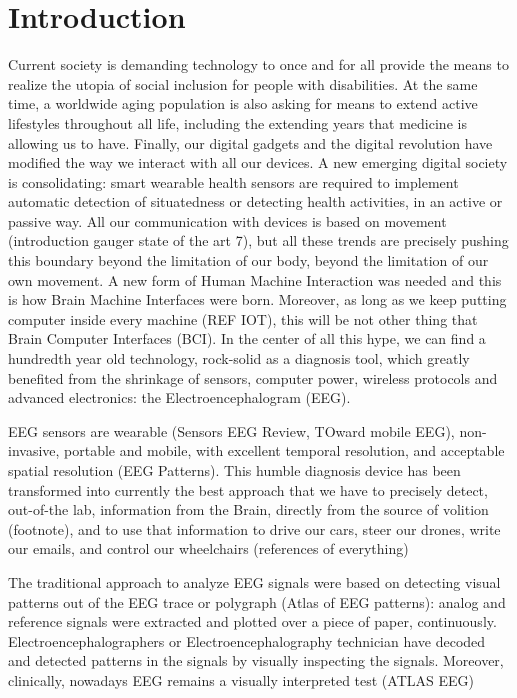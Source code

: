 \documentclass[sensors,article,submit,moreauthors,pdftex,10pt,a4paper]{mdpi}
\begin{document}

\setcounter{section}{-1} %

\section{Introduction}

Current society is demanding technology to once and for all provide the means to realize the utopia of social inclusion for people with disabilities.  At the same time, a worldwide aging population is also asking for means to extend active lifestyles throughout all life, including the extending years that medicine is allowing us to have.
Finally, our digital gadgets and the digital revolution have modified the way we interact with all our devices.  A new emerging digital society is consolidating: smart wearable health sensors are required to implement automatic detection of situatedness or detecting health activities, in an active or passive way.
All our communication with devices is based on movement (introduction gauger state of the art 7), but all these trends are precisely pushing this boundary beyond the limitation of our body, beyond the limitation of our own movement.  A new form of Human Machine Interaction was needed and this is how Brain Machine Interfaces were born.  Moreover, as long as we keep putting computer inside every machine (REF IOT), this will be not other thing that Brain Computer Interfaces (BCI).
In the center of all this hype, we can find a hundredth year old technology, rock-solid as a diagnosis tool, which greatly benefited from the shrinkage of sensors, computer power, wireless protocols and advanced electronics: the Electroencephalogram (EEG).

EEG sensors are wearable (Sensors EEG Review, TOward mobile EEG), non-invasive, portable and mobile, with excellent temporal resolution, and acceptable spatial resolution (EEG Patterns).  This humble diagnosis device has been transformed into  currently the best approach that we have to precisely detect, out-of-the lab, information from the Brain, directly from the source of volition (footnote), and to use that information to drive our cars, steer our drones, write our emails, and control our wheelchairs (references of everything)

The traditional approach to analyze EEG signals were based on detecting visual patterns out of the EEG trace or polygraph (Atlas of EEG patterns): analog and reference signals were extracted and plotted over a piece of paper, continuously. Electroencephalographers or Electroencephalography technician have decoded and detected patterns in the signals by visually inspecting the signals.  Moreover, clinically, nowadays EEG remains a visually interpreted test (ATLAS EEG)
\end{document}

